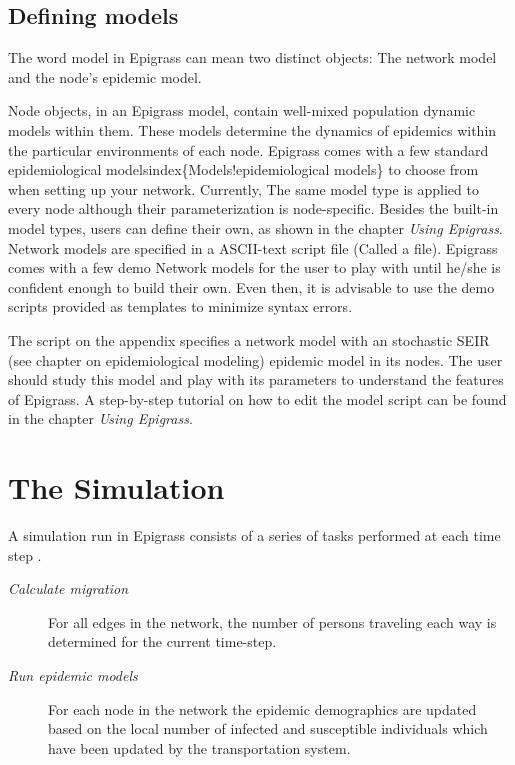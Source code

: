 \documentclass[a4paper,10pt]{manual}
\begin{document}
\subsection{Defining models}

The word model in Epigrass can mean two distinct objects: The network model and the node's epidemic model.

Node objects, in an Epigrass model, contain well-mixed population dynamic models within them. These models determine the dynamics of epidemics within the particular environments of each node. Epigrass comes with a few standard epidemiological modelsindex\{Models!epidemiological models\} to choose from when setting up your network. Currently, The same model type is applied to every node although their parameterization is node-specific. Besides the built-in model types, users can define their own, as shown in the chapter \emph{Using Epigrass}.
Network models are specified in a ASCII-text script file (Called a  file). Epigrass comes with a few demo Network models for the user to play with until he/she is confident enough to build their own. Even then, it is advisable to use the demo scripts provided as templates to minimize syntax errors.

The script on the appendix  specifies a network model with an stochastic SEIR (see chapter on epidemiological modeling) epidemic model in its nodes. The user should study this model and play with its parameters to understand the features of Epigrass. A step-by-step tutorial on how to edit the model script can be found in the chapter \emph{Using Epigrass}.


\section{The Simulation}

A simulation run in Epigrass consists of a series of tasks performed at each time step \footnotemark[1] .
\begin{description}
\item[\emph{Calculate migration}]
For all edges in the network, the number of persons traveling each way is determined for the current time-step.

\item[\emph{Run epidemic models}]
For each node in the network the epidemic demographics are updated based on the local number of infected and susceptible individuals which have been updated by the transportation system.

\end{description}
\end{document}

